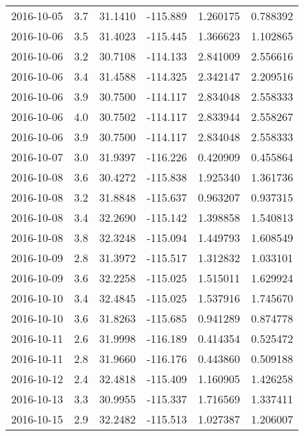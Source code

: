 \begin{tabular}{lrrrrr}
2016-10-05 &       3.7 &  31.1410 &  -115.889 &         1.260175 &         0.788392 \\
2016-10-06 &       3.5 &  31.4023 &  -115.445 &         1.366623 &         1.102865 \\
2016-10-06 &       3.2 &  30.7108 &  -114.133 &         2.841009 &         2.556616 \\
2016-10-06 &       3.4 &  31.4588 &  -114.325 &         2.342147 &         2.209516 \\
2016-10-06 &       3.9 &  30.7500 &  -114.117 &         2.834048 &         2.558333 \\
2016-10-06 &       4.0 &  30.7502 &  -114.117 &         2.833944 &         2.558267 \\
2016-10-06 &       3.9 &  30.7500 &  -114.117 &         2.834048 &         2.558333 \\
2016-10-07 &       3.0 &  31.9397 &  -116.226 &         0.420909 &         0.455864 \\
2016-10-08 &       3.6 &  30.4272 &  -115.838 &         1.925340 &         1.361736 \\
2016-10-08 &       3.2 &  31.8848 &  -115.637 &         0.963207 &         0.937315 \\
2016-10-08 &       3.4 &  32.2690 &  -115.142 &         1.398858 &         1.540813 \\
2016-10-08 &       3.8 &  32.3248 &  -115.094 &         1.449793 &         1.608549 \\
2016-10-09 &       2.8 &  31.3972 &  -115.517 &         1.312832 &         1.033101 \\
2016-10-09 &       3.6 &  32.2258 &  -115.025 &         1.515011 &         1.629924 \\
2016-10-10 &       3.4 &  32.4845 &  -115.025 &         1.537916 &         1.745670 \\
2016-10-10 &       3.6 &  31.8263 &  -115.685 &         0.941289 &         0.874778 \\
2016-10-11 &       2.6 &  31.9998 &  -116.189 &         0.414354 &         0.525472 \\
2016-10-11 &       2.8 &  31.9660 &  -116.176 &         0.443860 &         0.509188 \\
2016-10-12 &       2.4 &  32.4818 &  -115.409 &         1.160905 &         1.426258 \\
2016-10-13 &       3.3 &  30.9955 &  -115.337 &         1.716569 &         1.337411 \\
2016-10-15 &       2.9 &  32.2482 &  -115.513 &         1.027387 &         1.206007 \\

\end{tabular}
